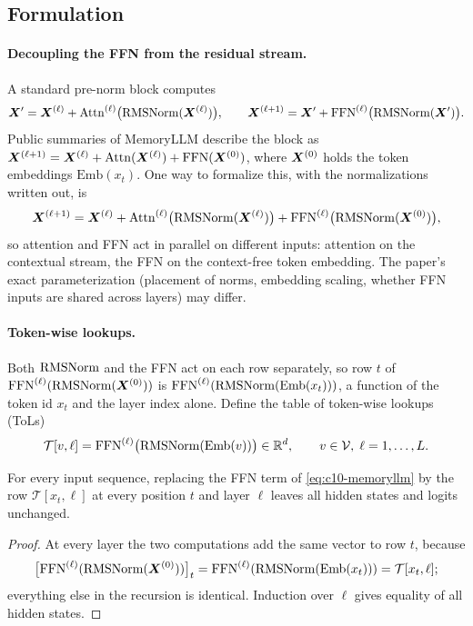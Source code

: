 \subsection{Formulation}

\paragraph{Decoupling the FFN from the residual stream.} A standard pre-norm block computes
\begin{equation}
  \bm{X}' = \bm{X}^{(\ell)} + \mathrm{Attn}^{(\ell)}\bigl(\operatorname{RMSNorm}(\bm{X}^{(\ell)})\bigr),\qquad
  \bm{X}^{(\ell+1)} = \bm{X}' + \mathrm{FFN}^{(\ell)}\bigl(\operatorname{RMSNorm}(\bm{X}')\bigr).
\end{equation}
Public summaries of MemoryLLM describe the block as
$\bm{X}^{(\ell+1)} = \bm{X}^{(\ell)} + \mathrm{Attn}(\bm{X}^{(\ell)}) + \mathrm{FFN}(\bm{X}^{(0)})$, where
$\bm{X}^{(0)}$ holds the token embeddings $\mathrm{Emb}(x_t)$. One way to formalize this, with the
normalizations written out, is
\begin{equation}
  \bm{X}^{(\ell+1)} = \bm{X}^{(\ell)} + \mathrm{Attn}^{(\ell)}\bigl(\operatorname{RMSNorm}(\bm{X}^{(\ell)})\bigr)
  + \mathrm{FFN}^{(\ell)}\bigl(\operatorname{RMSNorm}(\bm{X}^{(0)})\bigr),
  \label{eq:c10-memoryllm}
\end{equation}
so attention and FFN act in parallel on different inputs: attention on the contextual stream, the
FFN on the context-free token embedding. The paper's exact parameterization (placement of norms,
embedding scaling, whether FFN inputs are shared across layers) may differ.

\paragraph{Token-wise lookups.} Both $\operatorname{RMSNorm}$ and the FFN act on each row separately, so row $t$
of $\mathrm{FFN}^{(\ell)}(\operatorname{RMSNorm}(\bm{X}^{(0)}))$ is $\mathrm{FFN}^{(\ell)}(\operatorname{RMSNorm}(\mathrm{Emb}(x_t)))$,
a function of the token id $x_t$ and the layer index alone. Define the table of token-wise lookups
(ToLs)
\begin{equation}
  \mathcal{T}[v, \ell] = \mathrm{FFN}^{(\ell)}\bigl(\operatorname{RMSNorm}(\mathrm{Emb}(v))\bigr) \in \mathbb{R}^{d},
  \qquad v \in \mathcal{V},\; \ell = 1,\dots,L .
  \label{eq:c10-tol}
\end{equation}

\begin{proposition}\label{prop:c10-tol}
For every input sequence, replacing the FFN term of \cref{eq:c10-memoryllm} by the row
$\mathcal{T}[x_t, \ell]$ at every position $t$ and layer $\ell$ leaves all hidden states and logits
unchanged.
\end{proposition}
\begin{proof}
At every layer the two computations add the same vector to row $t$, because
\[
  \bigl[\mathrm{FFN}^{(\ell)}(\operatorname{RMSNorm}(\bm{X}^{(0)}))\bigr]_t
  = \mathrm{FFN}^{(\ell)}(\operatorname{RMSNorm}(\mathrm{Emb}(x_t))) = \mathcal{T}[x_t,\ell];
\]
everything else in the recursion is identical. Induction over $\ell$ gives equality of all hidden states.
\end{proof}

